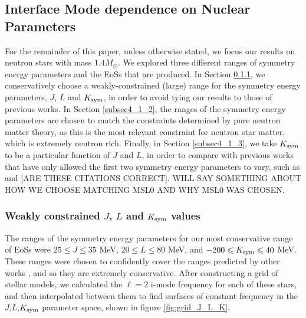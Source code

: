 \documentclass[fleqn,usenatbib]{mnras}
\begin{document}
\subsection{Interface Mode dependence on Nuclear Parameters}
\label{sec:grid}
\hspace{\parindent}For the remainder of this paper, unless otherwise stated, we focus our results on neutron stars with mass $1.4M_{\odot}$. We explored three different ranges of symmetry energy parameters and the EoSs that are produced. In Section \ref{subsec4_1_1}, we conservatively choose a weakly-constrained (large) range for the symmetry energy parameters, $J$, $L$ and $K_{\rm sym}$, in order to avoid tying our results to those of previous works. In Section \ref{subsec4_1_2}, the ranges of the symmetry energy parameters are chosen to match the constraints determined by pure neutron matter theory, as this is the most relevant constraint for neutron star matter, which is extremely neutron rich. Finally, in Section \ref{subsec4_1_3}, we take $K_{\rm sym}$ to be a particular function of $J$ and $L$, in order to compare with previous works that have only allowed the first two symmetry energy parameters to vary, such as \citet{steiner2012connecting} and \citet{tsang2009constraints} [ARE THESE CITATIONS CORRECT]. WILL SAY SOMETHING ABOUT HOW WE CHOOSE MATCHING MSL0 AND WHY MSL0 WAS CHOSEN.







\subsubsection{Weakly constrained $J$, $L$ and $K_{\rm sym}$ values}\label{subsec4_1_1}
\hspace{\parindent}The ranges of the symmetry energy parameters for our most conservative range of EoSs were $25\leq J\leq 35$ MeV, $20\leq L\leq 80$ MeV, and $-200\leq K_{\rm sym}\leq 40$ MeV. These ranges were chosen to confidently cover the ranges predicted by other works \citep{liu2010nuclear,tsang2012constraints,lattimer2013constraining}, and so they are extremely conservative. After constructing a grid of stellar models, we calculated the $\ell = 2$ i-mode frequency for each of these stars, and then interpolated between them to find surfaces of constant frequency in the $J$,$L$,$K_{\rm sym}$ parameter space, shown in figure \ref{fig:grid_J_L_K}.
\end{document}
